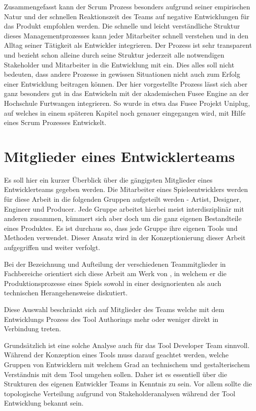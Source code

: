 \documentclass[pagesize, paper=a4, fontsize=12pt, titlepage=true, headings=small, headnosepline, abstractoff, liststotoc, nochapterprefix, plainheadsepline, twoside]{scrreprt}
\begin{document}
Zusammengefasst kann der Scrum Prozess besonders aufgrund seiner empirischen Natur und der schnellen Reaktionszeit des Teams auf negative Entwicklungen für das Produkt empfohlen werden. Die schnelle und leicht verständliche Struktur dieses Managementprozesses kann jeder Mitarbeiter schnell verstehen und in den Alltag seiner Tätigkeit als Entwickler integrieren. Der Prozess ist sehr transparent und bezieht schon alleine durch seine Struktur jederzeit alle notwendigen Stakeholder und Mitarbeiter in die Entwicklung mit ein. Dies alles soll nicht bedeuten, dass andere Prozesse in gewissen Situationen nicht auch zum Erfolg einer Entwicklung beitragen können. Der hier vorgestellte Prozess lässt sich aber ganz besonders gut in das Entwickeln mit der akademischen Fusee Engine an der Hochschule Furtwangen integrieren. So wurde in etwa das Fusee Projekt Uniplug, auf welches in einem späteren Kapitel noch genauer eingegangen wird, mit Hilfe eines Scrum Prozesses Entwickelt. 

\section{Mitglieder eines Entwicklerteams}
Es soll hier ein kurzer Überblick über die gängigsten Mitglieder eines Entwicklerteams gegeben werden. Die Mitarbeiter eines Spieleentwicklers werden für diese Arbeit in die folgenden Gruppen aufgeteilt werden - Artist, Designer, Engineer und Producer. Jede Gruppe arbeitet hierbei meist interdisziplinär mit anderen zusammen, kümmert sich aber doch um die ganz eigenen Bestandteile eines Produktes. Es ist durchaus so, dass jede Gruppe ihre eigenen Tools und Methoden verwendet. Dieser Ansatz wird in der Konzeptionierung dieser Arbeit aufgegriffen und weiter verfolgt.

Bei der Bezeichnung und Aufteilung der verschiedenen Teammitglieder in Fachbereiche orientiert sich diese Arbeit am Werk von , in welchem er die Produktionsprozesse eines Spiels sowohl in einer designorienten als auch technischen Herangehensweise diskutiert.

Diese Auswahl beschränkt sich auf Mitglieder des Teams welche mit dem Entwicklungs Prozess des Tool Authorings mehr oder weniger direkt in Verbindung treten.

Grundsätzlich ist eine solche Analyse auch für das Tool Developer Team sinnvoll. Während der Konzeption eines Tools muss darauf geachtet werden, welche Gruppen von Entwicklern mit welchem Grad an technischem und gestalterischem Verständnis mit dem Tool umgehen sollen. Daher ist es essentiell über die Strukturen des eigenen Entwickler Teams in Kenntnis zu sein. Vor allem sollte die topologische Verteilung aufgrund von Stakeholderanalysen während der Tool Entwicklung bekannt sein. 
\end{document}
